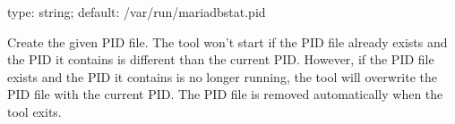 \documentclass[letterpaper,10pt,english]{sphinxmanual}
\begin{document}

\begin{fulllineitems}
\label{\detokenize{mariadb-stat:cmdoption-mariadb-stat-pid}}
type: string; default: /var/run/mariadb\sphinxhyphen{}stat.pid

Create the given PID file.  The tool won’t start if the PID file already
exists and the PID it contains is different than the current PID.  However,
if the PID file exists and the PID it contains is no longer running, the
tool will overwrite the PID file with the current PID.  The PID file is
removed automatically when the tool exits.

\end{fulllineitems}

\end{document}
